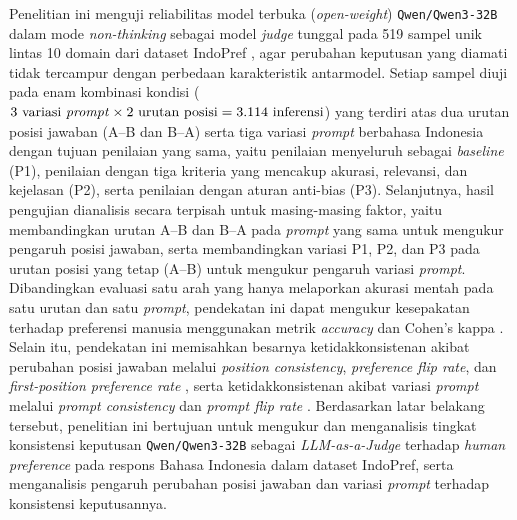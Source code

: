 Penelitian ini menguji reliabilitas model terbuka (\textit{open-weight}) \texttt{Qwen/\allowbreak Qwen3-\allowbreak 32B} dalam mode \textit{non-thinking} \cite{yangQwen3TechnicalReport2025} sebagai model \textit{judge} tunggal pada 519 sampel unik lintas 10 domain dari dataset IndoPref \cite{wiyonoIndoPrefMultiDomainPairwise2025}, agar perubahan keputusan yang diamati tidak tercampur dengan perbedaan karakteristik antarmodel. Setiap sampel diuji pada enam kombinasi kondisi ($3 \text{ variasi \textit{prompt}} \times 2 \text{ urutan posisi} = 3.114 \text{ inferensi}$) yang terdiri atas dua urutan posisi jawaban (A--B dan B--A) serta tiga variasi \textit{prompt} berbahasa Indonesia dengan tujuan penilaian yang sama, yaitu penilaian menyeluruh sebagai \textit{baseline} (P1), penilaian dengan tiga kriteria yang mencakup akurasi, relevansi, dan kejelasan (P2), serta penilaian dengan aturan anti-bias (P3). Selanjutnya, hasil pengujian dianalisis secara terpisah untuk masing-masing faktor, yaitu membandingkan urutan A--B dan B--A pada \textit{prompt} yang sama untuk mengukur pengaruh posisi jawaban, serta membandingkan variasi P1, P2, dan P3 pada urutan posisi yang tetap (A--B) untuk mengukur pengaruh variasi \textit{prompt}. Dibandingkan evaluasi satu arah yang hanya melaporkan akurasi mentah pada satu urutan dan satu \textit{prompt}, pendekatan ini dapat mengukur kesepakatan terhadap preferensi manusia menggunakan metrik \textit{accuracy} dan Cohen's kappa \cite{normanReliabilityValiditySystematic2026}\cite{raoAgreementMetricsLLMasJudge2026}. Selain itu, pendekatan ini memisahkan besarnya ketidakkonsistenan akibat perubahan posisi jawaban melalui \textit{position consistency}, \textit{preference flip rate}, dan \textit{first-position preference rate} \cite{shiJudgingJudgesSystematic}\cite{normanReliabilityValiditySystematic2026}, serta ketidakkonsistenan akibat variasi \textit{prompt} melalui \textit{prompt consistency} dan \textit{prompt flip rate} \cite{weiSystematicEvaluationLLMasaJudge2025}\cite{bellibatluJudgeSenseBenchmarkPrompt2026}. Berdasarkan latar belakang tersebut, penelitian ini bertujuan untuk mengukur dan menganalisis tingkat konsistensi keputusan \texttt{Qwen/\allowbreak Qwen3-\allowbreak 32B} sebagai \textit{LLM-as-a-Judge} terhadap \textit{human preference} pada respons Bahasa Indonesia dalam dataset IndoPref, serta menganalisis pengaruh perubahan posisi jawaban dan variasi \textit{prompt} terhadap konsistensi keputusannya.

